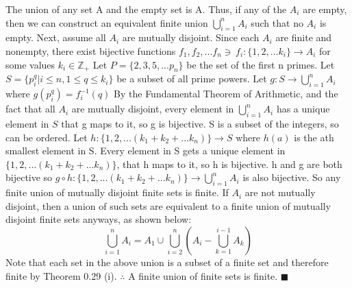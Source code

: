 \documentclass[12pt]{article}
\begin{document}
	The union of any set A and the empty set is A. Thus, if any of the \(A_i\) are empty, then we can construct an equivalent finite union \(\bigcup_{i=1}^n A_i\) such that no \(A_i\) is empty.
	\newline
	Next, assume all \(A_i\) are mutually disjoint.
	\newline
	Since each \(A_i\) are finite and nonempty, there exist bijective functions
	\(f_1,f_2,...f_n\ni\ f_i:\{1,2,...k_i\}\rightarrow A_i\) for some values \(k_i\in \mathbb{Z}_+\) \newline \newline
	Let \(P = \{2,3,5,...p_n\}\) be the set of the first n primes.
	\newline
	Let \(S = \{p_i^q| i \leq n, 1 \leq q \leq k_i\}\) be a subset of all prime powers.
	\newline \newline
	Let \(g: S \rightarrow \bigcup_{i=1}^n A_i\) where \(g(p_i^q)=f_i^{-1}(q)\)
	\newline
	By the Fundamental Theorem of Arithmetic, and the fact that all \(A_i\) are mutually disjoint, every element in \(\bigcup_{i=1}^n A_i\) has a unique element in \(S\) that g maps to it, so g is bijective.
	\newline \newline
	S is a subset of the integers, so can be ordered.
	\newline
	Let \(h: \{1,2,...(k_1+k_2+...k_n)\} \rightarrow S\) where \(h(a)\) is the ath smallest element in S.
	\newline
	Every element in S gets a unique element in \(\{1,2,...(k_1+k_2+...k_n)\}\), that h maps to it, so h is bijective.
	\newline \newline
	h and g are both bijective so \(g \circ h : \{1,2,...(k_1+k_2+...k_n)\} \rightarrow \bigcup_{i=1}^n A_i\) is also bijective.
	\newline
	So any finite union of mutually disjoint finite sets is finite.
	\newline
	If \(A_i\) are not mutually disjoint, then a union of such sets are equivalent to a finite union of mutually disjoint finite sets anyways, as shown below:
	\[\bigcup_{i=1}^n A_i = A_1 \cup \bigcup_{i=2}^n \left(A_i-\bigcup_{k=1}^{i-1} A_k\right)\]
	Note that each set in the above union is a subset of a finite set and therefore finite by Theorem 0.29 (i). \newline
	\(\therefore\) A finite union of finite sets is finite.
	\newline \(\blacksquare\) \newline \newline
\end{document}

